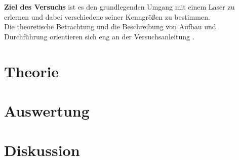 \documentclass[a4,11pt]{article}
\newcommand{\V}{V61}
\begin{document}



\tableofcontents
\clearpage

\textbf{Ziel des Versuchs} ist es den grundlegenden Umgang mit einem Laser zu erlernen und dabei verschiedene seiner Kenngrößen zu bestimmen. \\
Die theoretische Betrachtung und die Beschreibung von Aufbau und Durchführung orientieren sich eng an der Versuchsanleitung \cite{V61}.

\section{Theorie}

\clearpage



\clearpage


\section{Auswertung}
%
%

\clearpage


\section{Diskussion}


\clearpage
\listoftodos
\listoffigures
\listoftables
\clearpage
\nocite{\V}
\printbibliography[title = Literaturverzeichnis]
\end{document}
